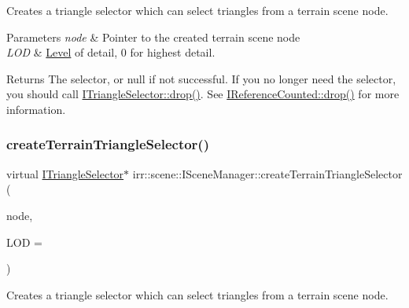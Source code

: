 Creates a triangle selector which can select triangles from a terrain scene node. 


\begin{DoxyParams}{Parameters}
{\em node} & Pointer to the created terrain scene node \\
\hline
{\em L\+OD} & \hyperlink{classLevel}{Level} of detail, 0 for highest detail. \\
\hline
\end{DoxyParams}
\begin{DoxyReturn}{Returns}
The selector, or null if not successful. If you no longer need the selector, you should call \hyperlink{classirr_1_1IReferenceCounted_a03856a09355b89d178090c4a5f738543}{I\+Triangle\+Selector\+::drop()}. See \hyperlink{classirr_1_1IReferenceCounted_a03856a09355b89d178090c4a5f738543}{I\+Reference\+Counted\+::drop()} for more information. 
\end{DoxyReturn}
\mbox{\label{classirr_1_1scene_1_1ISceneManager_af52f8c74e08637b7643d239542371bc5}} 
\subsubsection{\texorpdfstring{create\+Terrain\+Triangle\+Selector()}{createTerrainTriangleSelector()}\hspace{0.1cm}{\footnotesize\ttfamily [2/2]}}
{\footnotesize\ttfamily virtual \hyperlink{classirr_1_1scene_1_1ITriangleSelector}{I\+Triangle\+Selector}$\ast$ irr\+::scene\+::\+I\+Scene\+Manager\+::create\+Terrain\+Triangle\+Selector (\begin{DoxyParamCaption}\item[{\hyperlink{classirr_1_1scene_1_1ITerrainSceneNode}{I\+Terrain\+Scene\+Node} $\ast$}]{node,  }\item[{\hyperlink{namespaceirr_ac66849b7a6ed16e30ebede579f9b47c6}{s32}}]{L\+OD = {} }\end{DoxyParamCaption})\hspace{0.3cm}{\ttfamily [pure virtual]}}



Creates a triangle selector which can select triangles from a terrain scene node. 


